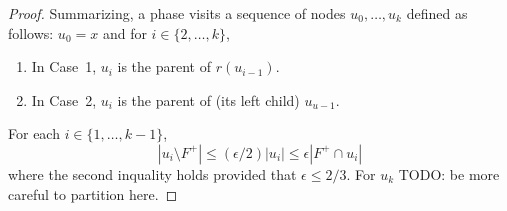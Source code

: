 \documentclass{patmorin}
\begin{document}
\begin{proof}
  Summarizing, a phase visits a sequence of nodes $u_0,\ldots,u_k$ defined as follows: $u_0=x$ and for $i\in\{2,\ldots,k\}$, 
  \begin{enumerate}
     \item In Case~1, $u_{i}$ is the parent of $r(u_{i-1})$.
     \item In Case~2, $u_i$ is the parent of (its left child) $u_{u-1}$.
  \end{enumerate}
  For each $i\in\{1,\ldots,k-1\}$,
  \[
	  |u_i\setminus F^+| \le (\epsilon/2)|u_i| \le \epsilon|F^+\cap u_i|
  \]
  where the second inquality holds provided that $\epsilon \le 2/3$.
  For $u_k$ TODO: be more careful to partition here.
%	
%	
%	
%
%  
%  
%
%
%
%
%  
%
%
%
%
%	
%	

\end{proof}
\end{document}
